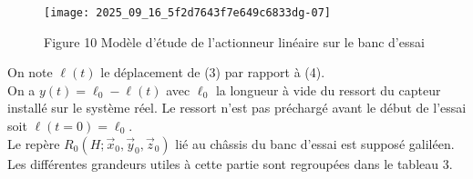 \begin{figure}[h]
\begin{center}
  \texttt{[image: 2025\_09\_16\_5f2d7643f7e649c6833dg-07]}
\captionsetup{labelformat=empty}
\caption{Figure 10 Modèle d'étude de l'actionneur linéaire sur le banc d'essai}
\end{center}
\end{figure}

On note $\ell(t)$ le déplacement de (3) par rapport à (4).\\
On a $y(t)=\ell_{0}-\ell(t)$ avec $\ell_{0}$ la longueur à vide du ressort du capteur installé sur le système réel. Le ressort n'est pas préchargé avant le début de l'essai soit $\ell(t=0)=\ell_{0}$.\\
Le repère $R_{0}\left(H ; \vec{x}_{0}, \vec{y}_{0}, \vec{z}_{0}\right)$ lié au châssis du banc d'essai est supposé galiléen.\\
Les différentes grandeurs utiles à cette partie sont regroupées dans le tableau 3.

